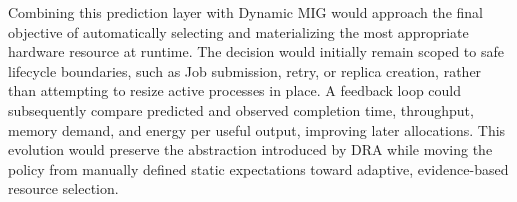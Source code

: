 Combining this prediction layer with Dynamic MIG would approach the final objective of automatically selecting and materializing the most appropriate hardware resource at runtime. The decision would initially remain scoped to safe lifecycle boundaries, such as Job submission, retry, or replica creation, rather than attempting to resize active processes in place. A feedback loop could subsequently compare predicted and observed completion time, throughput, memory demand, and energy per useful output, improving later allocations. This evolution would preserve the abstraction introduced by DRA while moving the policy from manually defined static expectations toward adaptive, evidence-based resource selection.
